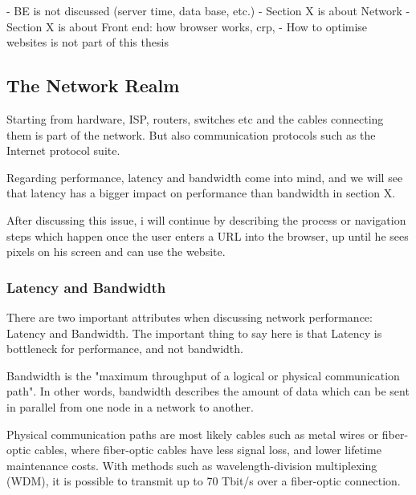 - BE is not discussed (server time, data base, etc.)
- Section X is about Network
- Section X is about Front end: how browser works, crp, 
- How to optimise websites is not part of this thesis





\subsection{The Network Realm}

Starting from hardware, ISP, routers, switches etc and the cables connecting them is part of the network.
But also communication protocols such as the Internet protocol suite.

Regarding performance, latency and bandwidth come into mind, and we will see that latency has a bigger impact on performance than bandwidth in section X.

After discussing this issue, i will continue by describing the process or navigation steps which happen once the user enters a URL into the browser, up until he sees pixels on his screen and can use the website.




\subsubsection{Latency and Bandwidth}

There are two important attributes when discussing network performance: Latency and Bandwidth.
The important thing to say here is that Latency is bottleneck for performance, and not bandwidth.



Bandwidth is the "maximum throughput of a logical or physical communication path". %
In other words, bandwidth describes the amount of data which can be sent in parallel from one node in a network to another. 

Physical communication paths are most likely cables such as metal wires or fiber-optic cables, where fiber-optic cables have less signal loss, and lower lifetime maintenance costs.
With methods such as wavelength-division multiplexing (WDM), it is possible to transmit up to 70 Tbit/s over a fiber-optic connection.  %

